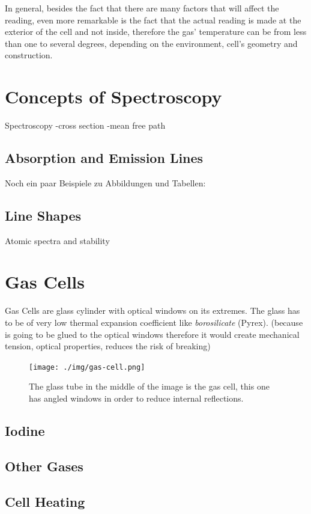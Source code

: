 \documentclass[master,       %
               twoside,        %
               BCOR10mm,       %
               ngerman,english  %
               ]{GAUBM_astro}
\begin{document}
In general, besides the fact that there are many factors that will affect the 
reading, even more remarkable is the fact that the actual reading is made at 
the exterior of the cell and not inside, therefore the gas' temperature can be 
from less than one to several degrees, depending on the environment, 
cell's geometry and construction.

\section{Concepts of Spectroscopy}
Spectroscopy 
-cross section
-mean free path

\subsection{Absorption and Emission Lines}
Noch ein paar Beispiele zu Abbildungen und Tabellen:
\subsection{Line Shapes}
Atomic spectra and stability
\section{Gas Cells}
Gas Cells are glass cylinder with optical windows on its extremes. The glass 
has to be of very low thermal expansion coefficient like \emph{borosilicate} 
(Pyrex). (because is going to be glued to the optical windows therefore it would 
create mechanical tension, optical properties, reduces the risk of breaking)

\begin{figure}[h!]
 \centering
 \texttt{[image: ./img/gas-cell.png]}
 \caption{The glass tube in the middle of the image is the gas cell, this one 
has angled windows in order to reduce internal reflections.}
 \label{fig:gas-cell}
\end{figure}


\subsection{Iodine}
\subsection{Other Gases}
\subsection{Cell Heating}
\end{document}
